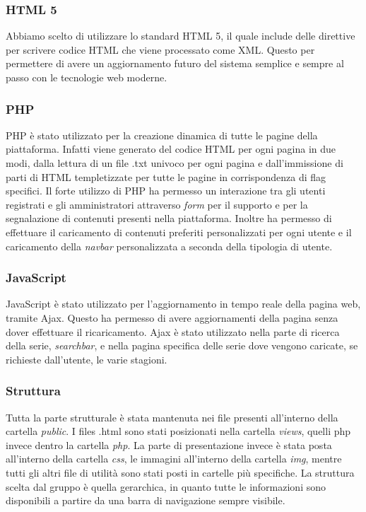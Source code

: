 \subsubsection{HTML 5}
Abbiamo scelto di utilizzare lo standard HTML 5, il quale include delle direttive per scrivere codice HTML che viene processato come XML. Questo per permettere di avere un aggiornamento futuro del sistema  semplice e sempre al passo con le tecnologie web moderne.

\subsubsection{PHP}
PHP è stato utilizzato per la creazione dinamica di tutte le pagine della piattaforma. Infatti viene generato del codice HTML per ogni pagina in due modi, dalla lettura di un file .txt univoco per ogni pagina e dall'immissione di parti di HTML templetizzate per tutte le pagine in corrispondenza di flag specifici. Il forte utilizzo di PHP ha permesso un interazione tra gli utenti registrati e gli amministratori attraverso \textit{form} per il supporto e per la segnalazione di contenuti presenti nella piattaforma. Inoltre ha permesso di effettuare il caricamento di contenuti preferiti personalizzati per ogni utente e il caricamento della \textit{navbar} personalizzata a seconda della tipologia di utente. 

\subsubsection{JavaScript}
JavaScript è stato utilizzato per l'aggiornamento in tempo reale della pagina web, tramite Ajax. Questo ha permesso di avere aggiornamenti della pagina senza dover effettuare il ricaricamento. Ajax è stato utilizzato nella parte di ricerca della serie, \textit{searchbar}, e nella pagina specifica delle serie dove vengono caricate, se richieste dall'utente, le varie stagioni. 

\subsubsection{Struttura}
Tutta la parte strutturale è stata mantenuta nei file presenti all'interno della cartella \textit{public}. I files .html sono stati posizionati nella cartella \textit{views}, quelli php invece dentro la cartella \textit{php}. La parte di presentazione invece è stata posta all'interno della cartella \textit{css}, le immagini all'interno della cartella \textit{img}, mentre tutti gli altri file di utilità sono stati posti in cartelle più specifiche. La struttura scelta dal gruppo è quella gerarchica, in quanto tutte le informazioni sono disponibili a partire da una barra di navigazione sempre visibile.

